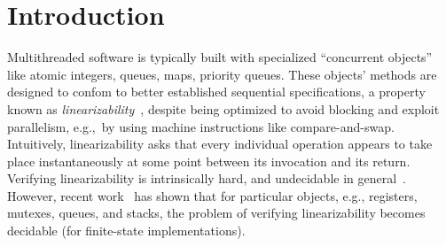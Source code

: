 \section{Introduction}
\label{sec:introduction}






 Multithreaded software is typically built with specialized “concurrent
  objects” like atomic integers, queues, maps, priority queues. These objects’ methods are
  designed to confom to better established sequential specifications, a property known as \emph{linearizability}~\cite{journals/toplas/HerlihyW90},
  despite being optimized to avoid blocking and exploit parallelism, e.g.,~by
  using machine instructions like compare-and-swap. Intuitively, linearizability asks that every individual operation appears to take place instantaneously at some point between its invocation and its return. Verifying linearizability is intrinsically hard, and undecidable in general~\cite{conf/esop/BouajjaniEEH13}. %
However, recent work~\cite{DBLP:conf/icalp/BouajjaniEEH15} has shown that for particular objects,
e.g., registers, mutexes, queues, and stacks, the problem of verifying linearizability becomes decidable (for finite-state implementations).

